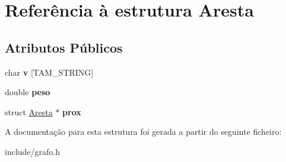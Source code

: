 \hypertarget{structAresta}{\section{Referência à estrutura Aresta}
\label{structAresta}
}
\subsection*{Atributos Públicos}
\begin{DoxyCompactItemize}
\item 
\hypertarget{structAresta_a6f69a67e062d0df73ac606e4313dc62e}{char {\bfseries v} \mbox{[}T\-A\-M\-\_\-\-S\-T\-R\-I\-N\-G\mbox{]}}\label{structAresta_a6f69a67e062d0df73ac606e4313dc62e}

\item 
\hypertarget{structAresta_a4d6a1b71f5dcd5a35cab87bb24dab3b3}{double {\bfseries peso}}\label{structAresta_a4d6a1b71f5dcd5a35cab87bb24dab3b3}

\item 
\hypertarget{structAresta_a9a0dbe60945590437bb155b64632f411}{struct \hyperlink{structAresta}{Aresta} $\ast$ {\bfseries prox}}\label{structAresta_a9a0dbe60945590437bb155b64632f411}

\end{DoxyCompactItemize}


A documentação para esta estrutura foi gerada a partir do seguinte ficheiro\-:\begin{DoxyCompactItemize}
\item 
include/grafo.\-h\end{DoxyCompactItemize}
